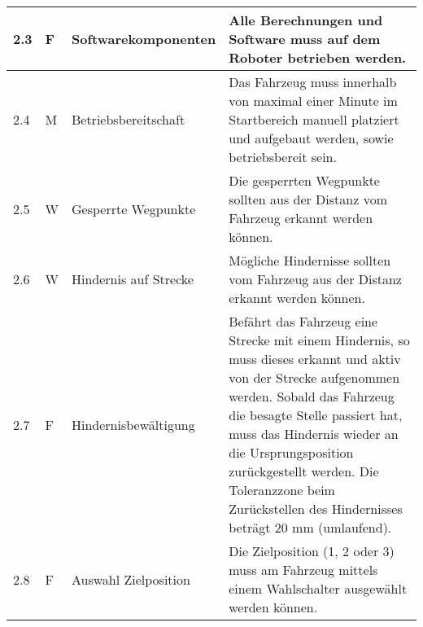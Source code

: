 \documentclass[main.tex]{subfiles} %
\begin{document}
\begin{tabular}{|l|p{0.5cm}|p{4cm}|p{10cm}|}
  \hline
  2.3          & F          & Softwarekomponenten   & Alle Berechnungen und Software muss auf dem Roboter betrieben werden.                                                                                                                                                                                                                                                                      \\
  \hline
  2.4          & M          & Betriebsbereitschaft  & Das Fahrzeug muss innerhalb von maximal einer Minute im Startbereich manuell platziert und aufgebaut werden, sowie betriebsbereit sein.                                                                                                                                                                                                    \\
  \hline
  2.5          & W          & Gesperrte Wegpunkte   & Die gesperrten Wegpunkte sollten aus der Distanz vom Fahrzeug erkannt werden können.                                                                                                                                                                                                                                                       \\
  \hline
  2.6          & W          & Hindernis auf Strecke & Mögliche Hindernisse sollten vom Fahrzeug aus der Distanz erkannt werden können.                                                                                                                                                                                                                                                           \\
  \hline
  2.7          & F          & Hindernisbewältigung  & Befährt das Fahrzeug eine Strecke mit einem Hindernis, so muss dieses erkannt und aktiv von der Strecke aufgenommen werden. Sobald das Fahrzeug die besagte Stelle passiert hat, muss das Hindernis wieder an die Ursprungsposition zurückgestellt werden. Die Toleranzzone beim Zurückstellen des Hindernisses beträgt 20 mm (umlaufend). \\
  \hline
  2.8          & F          & Auswahl Zielposition  & Die Zielposition (1, 2 oder 3) muss am Fahrzeug mittels einem Wahlschalter ausgewählt werden können.                                                                                                                                                                                                                                       \\

\end{tabular}
\end{document}
